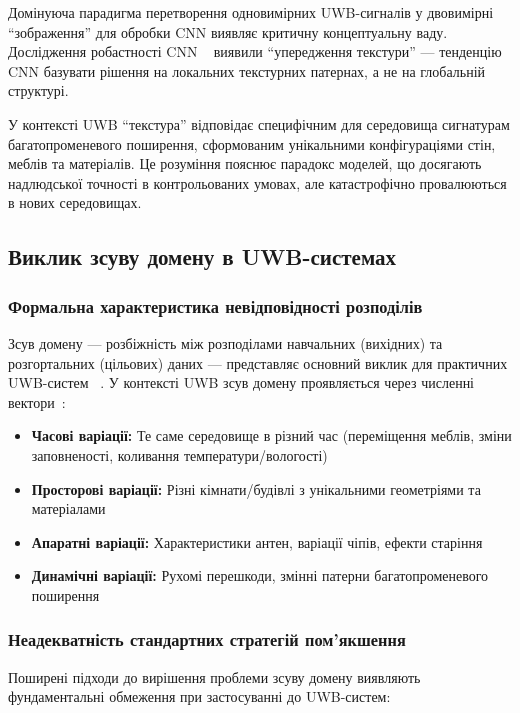 \documentclass[12pt,a4paper]{article}
\begin{document}
Домінуюча парадигма перетворення одновимірних UWB-сигналів у двовимірні ``зображення'' для обробки CNN виявляє критичну концептуальну ваду. Дослідження робастності CNN ~\cite{hendrycks2019benchmarking} виявили ``упередження текстури'' --- тенденцію CNN базувати рішення на локальних текстурних патернах, а не на глобальній структурі. 

У контексті UWB ``текстура'' відповідає специфічним для середовища сигнатурам багатопроменевого поширення, сформованим унікальними конфігураціями стін, меблів та матеріалів. Це розуміння пояснює парадокс моделей, що досягають надлюдської точності в контрольованих умовах, але катастрофічно провалюються в нових середовищах.

\subsection{Виклик зсуву домену в UWB-системах}

\subsubsection{Формальна характеристика невідповідності розподілів}

Зсув домену --- розбіжність між розподілами навчальних (вихідних) та розгортальних (цільових) даних --- представляє основний виклик для практичних UWB-систем ~\cite{wilson2020domain}. У контексті UWB зсув домену проявляється через численні вектори~\cite{domain_adversarial_uwb_2024}:

\begin{itemize}
	\item \textbf{Часові варіації:} Те саме середовище в різний час (переміщення меблів, зміни заповненості, коливання температури/вологості)
	\item \textbf{Просторові варіації:} Різні кімнати/будівлі з унікальними геометріями та матеріалами  
	\item \textbf{Апаратні варіації:} Характеристики антен, варіації чіпів, ефекти старіння
	\item \textbf{Динамічні варіації:} Рухомі перешкоди, змінні патерни багатопроменевого поширення
\end{itemize}

\subsubsection{Неадекватність стандартних стратегій пом'якшення}

Поширені підходи до вирішення проблеми зсуву домену виявляють фундаментальні обмеження при застосуванні до UWB-систем:
\end{document}
